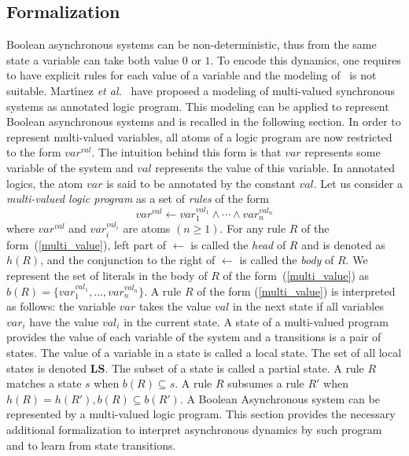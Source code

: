 \subsection{Formalization}
    
	Boolean asynchronous systems can be non-deterministic, thus from the same state a variable can take both value $0$ or $1$.
	To encode this dynamics, one requires to have explicit rules for each value of a variable and the modeling of~\cite{ribeiro2015learning} is not suitable.
	Mart{\'\i}nez \textit{et al.}~\cite{DMTRICLP15} have proposed a modeling of multi-valued synchronous systems as annotated logic program.
    This modeling can be applied to represent Boolean asynchronous systems and is recalled in the following section.
	In order to represent multi-valued variables, all atoms of a logic program are now restricted to the form $var^{val}$.
	The intuition behind this form is that $var$ represents some variable of the system and $val$ represents the value of this variable.
	In annotated logics, the atom $var$ is said to be annotated by the constant $val$.
	Let us consider a {\it multi-valued logic program\/} as a set of {\it rules\/} of the form  
	\begin{equation}\label{multi_value}
		var^{val} \leftarrow var_1^{val_1} \wedge \cdots \wedge var_n^{val_n}
	\end{equation}
	where $var^{val}$ and $var_i^{val_i}$ are atoms $(n \geq 1)$.
	For any rule $R$ of the form~(\ref{multi_value}), left part of $\leftarrow$ is called the \textit{head} of $R$ and is denoted as $h(R)$,
	and the conjunction to the right of $\leftarrow$ is called the \textit{body} of $R$.  
	We represent the set of literals in the body of $R$ of the form~(\ref{multi_value}) as $b(R)=\{var_1^{val_1},\ldots,var_n^{val_n}\}$. 
	A rule $R$ of the form (\ref{multi_value}) is interpreted as follows:
	the variable $var$ takes the value $val$ in the next state if all variables $var_i$ have the value $val_i$ in the current state.
	A state of a multi-valued program provides the value of each variable of the system and a transitions is a pair of states.
	The value of a variable in a state is called a local state.
	The set of all local states is denoted $\mathbf{LS}$.
	The subset of a state is called a partial state.
	A rule $R$ matches a state $s$ when $b(R) \subseteq s$.
	A rule $R$ subsumes a rule $R'$ when $h(R)=h(R'), b(R) \subseteq b(R')$.
%
A Boolean Asynchronous system can be represented by a multi-valued logic program.
This section provides the necessary additional formalization to interpret asynchronous dynamics by such program and to learn from state transitions.

